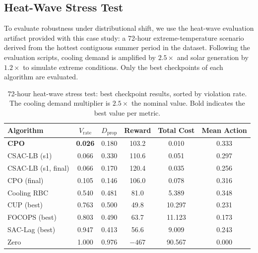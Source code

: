 \subsection{Heat-Wave Stress Test}
\label{sec:temp-results-heatwave}

To evaluate robustness under distributional shift, we use the heat-wave
evaluation artifact provided with this case study: a 72-hour extreme-temperature
scenario derived from the hottest contiguous summer period in the dataset.
Following the evaluation scripts, cooling demand is amplified by $2.5\times$
and solar generation by $1.2\times$ to simulate extreme conditions.  Only the
best checkpoints of each algorithm are evaluated.

\begin{table}[htbp]
\centering
\caption{72-hour heat-wave stress test: best checkpoint results, sorted by
  violation rate.  The cooling demand multiplier is $2.5\times$ the nominal
  value.  Bold indicates the best value per metric.}
\label{tab:heatwave}
\begin{tabular}{lccccc}
\toprule
\textbf{Algorithm}
  & \textbf{$V_{\text{rate}}$}
  & \textbf{$D_{\text{prop}}$}
  & \textbf{Reward}
  & \textbf{Total Cost}
  & \textbf{Mean Action} \\
\midrule
\textbf{CPO}        & \textbf{0.026} & 0.180 & 103.2  & 0.010 & 0.333 \\
CSAC-LB (s1)        & 0.066          & 0.330 & 110.6  & 0.051 & 0.297 \\
CSAC-LB (s1, final) & 0.066          & 0.170 & 120.4  & 0.035 & 0.256 \\
CPO (final)         & 0.105          & 0.146 & 106.0  & 0.078 & 0.316 \\
\midrule
Cooling RBC         & 0.540          & 0.481 & 81.0   & 5.389 & 0.348 \\
\midrule
CUP (best)          & 0.763          & 0.500 & 49.8   & 10.297 & 0.231 \\
FOCOPS (best)       & 0.803          & 0.490 & 63.7   & 11.123 & 0.173 \\
SAC-Lag (best)      & 0.947          & 0.413 & 56.6   & 9.009  & 0.243 \\
Zero                & 1.000          & 0.976 & $-467$ & 90.567 & 0.000 \\
\bottomrule
\end{tabular}
\end{table}

